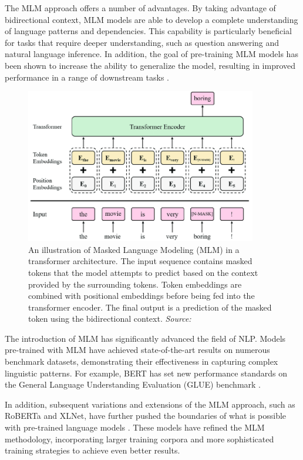 The MLM approach offers a number of advantages. By taking advantage of bidirectional context, MLM models are able to develop a complete understanding of language patterns and dependencies. This capability is particularly beneficial for tasks that require deeper understanding, such as question answering and natural language inference. In addition, the goal of pre-training MLM models has been shown to increase the ability to generalize the model, resulting in improved performance in a range of downstream tasks \cite{yang2019xlnet}.

\begin{figure}[h]
    \centering
    \includegraphics[width=0.9\textwidth]{images/llms/Model-structure-of-the-label-masked-language-model-N-MASK-is-a-mask-token-containing.png}
    \caption{An illustration of Masked Language Modeling (MLM) in a transformer architecture. The input sequence contains masked tokens that the model attempts to predict based on the context provided by the surrounding tokens. Token embeddings are combined with positional embeddings before being fed into the transformer encoder. The final output is a prediction of the masked token using the bidirectional context. \textit{Source:} \cite{park2019}}
    \label{fig:mlm_architecture}
\end{figure}

The introduction of MLM has significantly advanced the field of NLP. Models pre-trained with MLM have achieved state-of-the-art results on numerous benchmark datasets, demonstrating their effectiveness in capturing complex linguistic patterns. For example, BERT has set new performance standards on the General Language Understanding Evaluation (GLUE) benchmark \cite{wang2018glue}.

In addition, subsequent variations and extensions of the MLM approach, such as RoBERTa and XLNet, have further pushed the boundaries of what is possible with pre-trained language models \cite{liu2019roberta, yang2019xlnet}. These models have refined the MLM methodology, incorporating larger training corpora and more sophisticated training strategies to achieve even better results.

